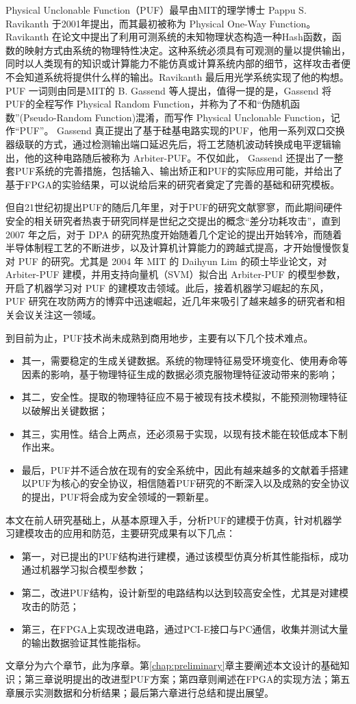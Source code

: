 Physical Unclonable Function（PUF）最早由MIT的理学博士 Pappu S. Ravikanth 于2001年提出，而其最初被称为 Physical One-Way Function。Ravikanth 在论文中提出了利用可测系统的未知物理状态构造一种Hash函数，函数的映射方式由系统的物理特性决定。这种系统必须具有可观测的量以提供输出，同时以人类现有的知识或计算能力不能仿真或计算系统内部的细节，这样攻击者便不会知道系统将提供什么样的输出。Ravikanth 最后用光学系统实现了他的构想。PUF 一词则由同是MIT的 B. Gassend 等人提出，值得一提的是，Gassend 将PUF的全程写作 Physical Random Function，并称为了不和“伪随机函数”(Pseudo-Random Function)混淆，而写作 Physical Unclonable Function，记作``PUF”。 Gassend 真正提出了基于硅基电路实现的PUF，他用一系列双口交换器级联的方式，通过检测输出端口延迟先后，将工艺随机波动转换成电平逻辑输出，他的这种电路随后被称为 Arbiter-PUF。不仅如此， Gassend 还提出了一整套PUF系统的完善措施，包括输入、输出矫正和PUF的实际应用可能，并给出了基于FPGA的实验结果，可以说给后来的研究者奠定了完善的基础和研究模板。

但自21世纪初提出PUF的随后几年里，对于PUF的研究文献寥寥，而此期间硬件安全的相关研究者热衷于研究同样是世纪之交提出的概念“差分功耗攻击”，直到 2007 年之后，对于 DPA 的研究热度开始随着几个定论的提出开始转冷，而随着半导体制程工艺的不断进步，以及计算机计算能力的跨越式提高，才开始慢慢恢复对 PUF 的研究。尤其是 2004 年 MIT 的 Daihyun Lim 的硕士毕业论文，对 Arbiter-PUF 建模，并用支持向量机（SVM）拟合出 Arbiter-PUF 的模型参数，开启了机器学习对 PUF 的建模攻击领域。此后，接着机器学习崛起的东风， PUF 研究在攻防两方的博弈中迅速崛起，近几年来吸引了越来越多的研究者和相关会议关注这一领域。

到目前为止，PUF技术尚未成熟到商用地步，主要有以下几个技术难点。
\begin{itemize}
\item 其一，需要稳定的生成关键数据。系统的物理特征易受环境变化、使用寿命等因素的影响，基于物理特征生成的数据必须克服物理特征波动带来的影响；
\item 其二，安全性。提取的物理特征应不易于被现有技术模拟，不能预测物理特征以破解出关键数据；
\item 其三，实用性。结合上两点，还必须易于实现，以现有技术能在较低成本下制作出来。
\item 最后，PUF并不适合放在现有的安全系统中，因此有越来越多的文献着手搭建以PUF为核心的安全协议，相信随着PUF研究的不断深入以及成熟的安全协议的提出，PUF将会成为安全领域的一颗新星。
\end{itemize}

本文在前人研究基础上，从基本原理入手，分析PUF的建模于仿真，针对机器学习建模攻击的应用和防范，主要研究成果有以下几点：
\begin{itemize}
\item 第一，对已提出的PUF结构进行建模，通过该模型仿真分析其性能指标，成功通过机器学习拟合模型参数；
\item 第二，改进PUF结构，设计新型的电路结构以达到较高安全性，尤其是对建模攻击的防范；
\item 第三，在FPGA上实现改进电路，通过PCI-E接口与PC通信，收集并测试大量的输出数据验证其性能指标。
\end{itemize}

文章分为六个章节，此为序章。第\ref{chap:preliminary}章主要阐述本文设计的基础知识；第三章说明提出的改进型PUF方案；第四章则阐述在FPGA的实现方法；第五章展示实测数据和分析结果；最后第六章进行总结和提出展望。


